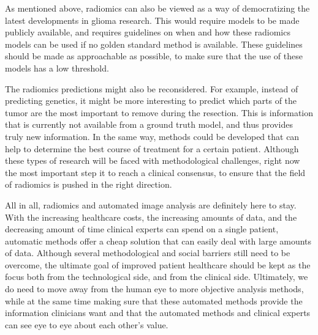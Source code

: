 As mentioned above, radiomics can also be viewed as a way of democratizing the latest  developments in glioma research.
This would require models to be made publicly available, and requires guidelines on when and how these radiomics models can be used if no golden standard method is available.
These guidelines should be made as approachable as possible, to make sure that the use of these models has a low threshold.


The radiomics predictions might also be reconsidered.
For example, instead of predicting genetics, it might be more interesting to predict which parts of the \gls{tumor} are the most important to remove during the resection.
This is information that is currently not available from a ground truth model, and thus provides truly new information.
In the same way, methods could be developed that can help to determine the best course of treatment for a certain patient.
Although these types of research will be faced with methodological challenges, right now the most important step it to reach a clinical consensus, to ensure that the field of radiomics is pushed in the right direction.

All in all, radiomics and automated image analysis are definitely here to stay.
With the increasing healthcare costs, the increasing amounts of data, and the decreasing amount of time clinical experts can spend on a single patient, automatic methods offer a cheap solution that can easily deal with large amounts of data.
Although several methodological and social barriers still need to be overcome, the ultimate goal of improved patient healthcare should be kept as the focus both from the technological side, and from the clinical side.
Ultimately, we do need to move away from the human eye to more objective analysis methods, while at the same time making sure that these automated methods provide the information clinicians want and that the automated methods and clinical experts can see eye to eye about each other's value.
